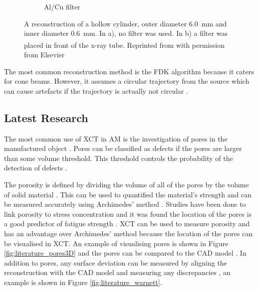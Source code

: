 \begin{figure}
\begin{subfigure}[b]{0.4\textwidth}
      \caption{Al/Cu filter}
    \end{subfigure}
  \caption{A reconstruction of a hollow cylinder, outer diameter \SI{6.0}{\milli\metre} and inner diameter \SI{0.6}{\milli\metre}. In a), no filter was used. In b) a filter was placed in front of the x-ray tube. Reprinted from \citep{kruth2011computed}\textsuperscript{\textcopyright} with permission from Elsevier}
  \label{fig:literature_hardening}
\end{figure}

The most common reconstruction method is the FDK \citep{feldkamp1984practical} algorithm because it caters for cone beams. However, it assumes a circular trajectory from the source which can cause artefacts if the trajectory is actually not circular \citep{sun2016applications}.

\subsection{Latest Research}

The most common use of XCT in AM is the investigation of pores in the manufactured object \citep{thompson2016x}. Pores can be classified as defects if the pores are larger than some volume threshold. This threshold controls the probability of the detection of defects \citep{gandossi2010probability, amrhein2014characterization}.

The porosity is defined by dividing the volume of all of the pores by the volume of solid material \citep{taud2005porosity}. This can be used to quantified the material's strength and can be measured accurately using Archimedes' method \citep{spierings2011comparison}. Studies have been done to link porosity to stress concentration \citep{leuders2015fatigue, siddique2015computed, carlton2016damage} and it was found the location of the pores is a good predictor of fatigue strength \citep{leuders2015fatigue}. XCT can be used to measure porosity and has an advantage over Archimedes' method because the location of the pores can be visualised in XCT. An example of visualising pores is shown in Figure \ref{fig:literature_pores3D} and the pores can be compared to the CAD model \citep{lee2015compliance, villarraga2015assessing, kim2016inspection}. In addition to pores, any surface deviation can be measured by aligning the reconstruction with the CAD model and measuring any discrepancies \citep{lee2015compliance, villarraga2015assessing, kim2016inspection}, an example is shown in Figure \ref{fig:literature_warnett}.

